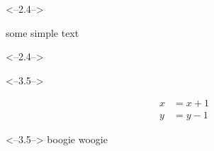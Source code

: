 <--2.4-->

some simple text

<--2.4-->

<--3.5-->

\begin{align*}

x &= x + 1 \\
y &= y - 1

\end{align*}

<--3.5-->
boogie woogie
